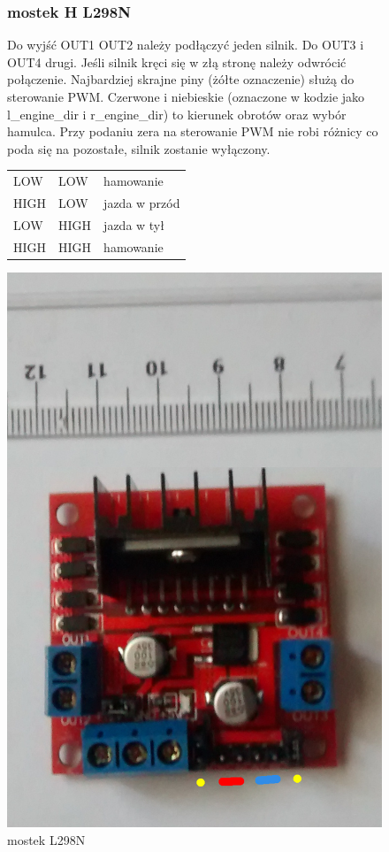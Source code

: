 \documentclass[a4paper,11pt]{article}
\def\SCALE{0.6}
\begin{document}
\begin{figure}[H]
	\subsubsection{mostek H L298N}
	Do wyjść OUT1 OUT2 należy podłączyć jeden silnik. Do OUT3 i OUT4 drugi. Jeśli silnik kręci się w złą stronę należy odwrócić połączenie.
	Najbardziej skrajne piny (żółte oznaczenie) służą do sterowanie PWM. Czerwone i niebieskie (oznaczone w kodzie jako l\_engine\_dir i r\_engine\_dir) to kierunek obrotów oraz wybór hamulca. Przy podaniu zera na sterowanie PWM nie robi różnicy co poda się na pozostałe, silnik zostanie wyłączony.

	\begin{tabular}{|l|l|l|}
		\hline
		LOW & LOW & hamowanie \\
		HIGH & LOW & jazda w przód \\
		LOW & HIGH & jazda w tył \\
		HIGH & HIGH & hamowanie \\
		\hline				

	\end{tabular}
	\centering
	\includegraphics[width=\SCALE
	\paperwidth]{mostek}
	\caption{mostek L298N}
\end{figure}
\end{document}
